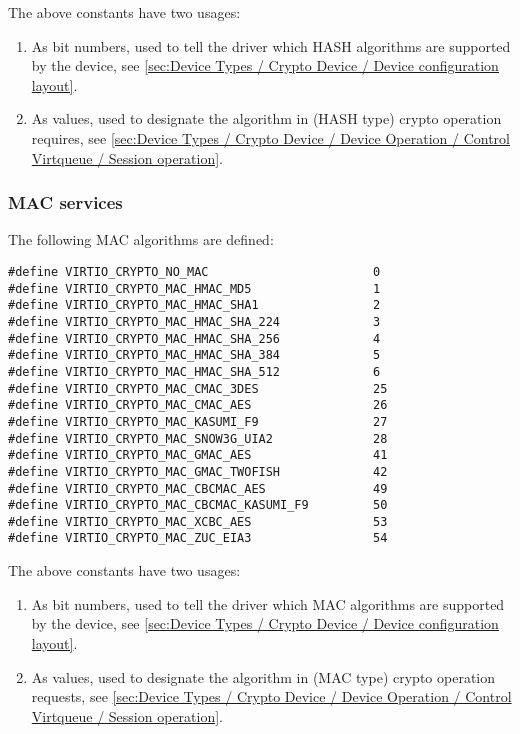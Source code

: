 The above constants have two usages:
\begin{enumerate}
\item As bit numbers, used to tell the driver which HASH algorithms
are supported by the device, see \ref{sec:Device Types / Crypto Device / Device configuration layout}.
\item As values, used to designate the algorithm in (HASH type) crypto
operation requires, see \ref{sec:Device Types / Crypto Device / Device Operation / Control Virtqueue / Session operation}.
\end{enumerate}

\subsubsection{MAC services}\label{sec:Device Types / Crypto Device / Supported crypto services / MAC services}

The following MAC algorithms are defined:

\begin{lstlisting}
#define VIRTIO_CRYPTO_NO_MAC                       0
#define VIRTIO_CRYPTO_MAC_HMAC_MD5                 1
#define VIRTIO_CRYPTO_MAC_HMAC_SHA1                2
#define VIRTIO_CRYPTO_MAC_HMAC_SHA_224             3
#define VIRTIO_CRYPTO_MAC_HMAC_SHA_256             4
#define VIRTIO_CRYPTO_MAC_HMAC_SHA_384             5
#define VIRTIO_CRYPTO_MAC_HMAC_SHA_512             6
#define VIRTIO_CRYPTO_MAC_CMAC_3DES                25
#define VIRTIO_CRYPTO_MAC_CMAC_AES                 26
#define VIRTIO_CRYPTO_MAC_KASUMI_F9                27
#define VIRTIO_CRYPTO_MAC_SNOW3G_UIA2              28
#define VIRTIO_CRYPTO_MAC_GMAC_AES                 41
#define VIRTIO_CRYPTO_MAC_GMAC_TWOFISH             42
#define VIRTIO_CRYPTO_MAC_CBCMAC_AES               49
#define VIRTIO_CRYPTO_MAC_CBCMAC_KASUMI_F9         50
#define VIRTIO_CRYPTO_MAC_XCBC_AES                 53
#define VIRTIO_CRYPTO_MAC_ZUC_EIA3                 54
\end{lstlisting}

The above constants have two usages:
\begin{enumerate}
\item As bit numbers, used to tell the driver which MAC algorithms
are supported by the device, see \ref{sec:Device Types / Crypto Device / Device configuration layout}.
\item As values, used to designate the algorithm in (MAC type) crypto
operation requests, see \ref{sec:Device Types / Crypto Device / Device Operation / Control Virtqueue / Session operation}.
\end{enumerate}

